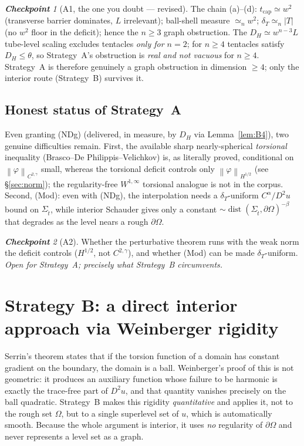 \documentclass[11pt]{amsart}
\theoremstyle{definition}
\theoremstyle{remark}
\newtheorem*{checkpoint}{\textbf{Checkpoint}}
\newcommand{\Om}{\Omega}
\newcommand{\St}{\Sigma_{\hat t}}
\newcommand{\dT}{\delta_T}
\newcommand{\Hess}{D^2u}
\newcommand{\norm}[1]{\left\lVert#1\right\rVert}
\DeclareMathOperator{\dist}{dist}
\begin{document}
\begin{checkpoint}[A1, the one you doubt --- revised]
The chain (a)--(d): $t_{\mathrm{cap}}\simeq w^2$ (transverse barrier
dominates, $L$ irrelevant); ball-shell measure $\simeq_n w^2$;
$\dT\simeq_n|T|$ (no $w^2$ floor in the deficit); hence the $n\ge3$
graph obstruction. The $D_H\simeq w^{n-3}L$ tube-level scaling excludes
tentacles \emph{only for $n=2$}; for $n\ge4$ tentacles satisfy
$D_H\le\theta$, so Strategy~A's obstruction is \emph{real and not
vacuous} for $n\ge4$. Strategy~A is therefore genuinely a graph
obstruction in dimension $\ge4$; only the interior route (Strategy~B)
survives it.
\end{checkpoint}

\subsection{Honest status of Strategy~A}
Even granting (NDg) (delivered, in measure, by $D_H$ via Lemma~\ref{lem:B4}),
two genuine difficulties remain. First, the available sharp nearly-spherical
\emph{torsional} inequality (Brasco--De Philippis--Velichkov) is, as
literally proved, conditional on
$\norm{\varphi}_{C^{2,\gamma}}$ small, whereas the torsional deficit controls
only $\norm{\varphi}_{H^{1/2}}$ (see \S\ref{sec:norm}); the regularity-free
$W^{1,\infty}$ torsional analogue is not in the corpus. Second, (Mod): even
with (NDg), the interpolation needs a $\dT$-uniform $C^\alpha/\Hess$ bound on
$\St$, while interior Schauder gives only a constant
$\sim\dist(\St,\partial\Om)^{-\beta}$ that degrades as the level nears a rough
$\partial\Om$.
\begin{checkpoint}[A2]
Whether the perturbative theorem runs with the weak norm the deficit controls
($H^{1/2}$, not $C^{2,\gamma}$), and whether (Mod) can be made $\dT$-uniform.
\emph{Open for Strategy~A; precisely what Strategy~B circumvents.}
\end{checkpoint}

\section{Strategy B: a direct interior approach via Weinberger rigidity}

Serrin's theorem states that if the torsion function of a domain has constant
gradient on the boundary, the domain is a ball. Weinberger's proof of this is
not geometric: it produces an auxiliary function whose failure to be harmonic
is exactly the trace-free part of $\Hess$, and that quantity vanishes
precisely on the ball quadratic. Strategy~B makes this rigidity
\emph{quantitative} and applies it, not to the rough set $\Om$, but to a
single superlevel set of $u$, which is automatically smooth. Because the whole
argument is interior, it uses \emph{no} regularity of $\partial\Om$ and never
represents a level set as a graph.
\end{document}
